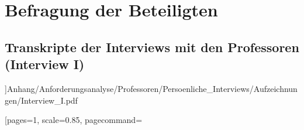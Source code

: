 \documentclass[bibliography=totoc,listof=totoc,BCOR=5mm,DIV=12,oneside]{scrbook}
\begin{document}
{\section{Befragung der Beteiligten}
\label{anhang:interviewProfessorenTranskripte}
\subsection{Transkripte der Interviews mit den Professoren (Interview I)}
\label{anhang:interviewProfessorenTranskripteInterviewI}]{Anhang/Anforderungsanalyse/Professoren/Persoenliche_Interviews/Aufzeichnungen/Interview_I.pdf}











[pages=1, scale=0.85, pagecommand=
}
\end{document}
